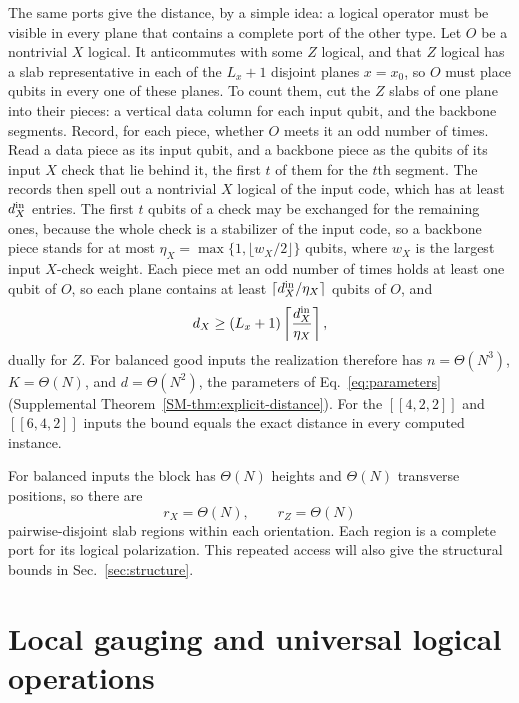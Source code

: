 The same ports give the distance, by a simple idea: a logical operator must
be visible in every plane that contains a complete port of the other type.
Let $O$ be a nontrivial $X$ logical.  It anticommutes with some $Z$ logical,
and that $Z$ logical has a slab representative in each of the $L_x+1$
disjoint planes $x=x_0$, so $O$ must place qubits in every one of these
planes.  To count them, cut the $Z$ slabs of one plane into their pieces: a
vertical data column for each input qubit, and the backbone segments.
Record, for each piece, whether $O$ meets it an odd number of times.  Read a
data piece as its input qubit, and a backbone piece as the qubits of its
input $X$ check that lie behind it, the first $t$ of them for the $t$th
segment.  The records then spell out a nontrivial $X$ logical of the input
code, which has at least $d_X^{\rm in}$ entries.  The first $t$ qubits of a
check may be exchanged for the remaining ones, because the whole check is a
stabilizer of the input code, so a backbone piece stands for at most
$\eta_X=\max\{1,\lfloor w_X/2\rfloor\}$ qubits, where $w_X$ is the largest
input $X$-check weight.  Each piece met an odd number of times holds at least
one qubit of $O$, so each plane contains at least
$\lceil d_X^{\rm in}/\eta_X\rceil$ qubits of $O$, and
\begin{equation}
 d_X\ge(L_x+1)\left\lceil\frac{d_X^{\rm in}}{\eta_X}\right\rceil,
 \label{eq:distance}
\end{equation}
dually for $Z$.  For balanced good inputs the realization therefore has
$n=\Theta(N^3)$, $K=\Theta(N)$, and $d=\Theta(N^2)$, the parameters of
Eq.~\eqref{eq:parameters} (Supplemental
Theorem~\ref{SM-thm:explicit-distance}).  For the $[[4,2,2]]$ and $[[6,4,2]]$
inputs the bound equals the exact distance in every computed instance.

For balanced inputs the block has $\Theta(N)$ heights and $\Theta(N)$
transverse positions, so there are
\begin{equation}
 r_X=\Theta(N),\qquad r_Z=\Theta(N)
 \label{eq:mobility}
\end{equation}
pairwise-disjoint slab regions within each orientation. Each region is a
complete port for its logical polarization. This repeated access will also
give the structural bounds in Sec.~\ref{sec:structure}.

\section{Local gauging and universal logical operations}
\label{sec:measurements}
